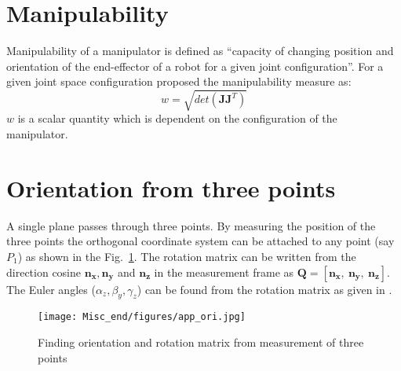 \section{Manipulability}
\label{app:manip}
Manipulability of a manipulator is defined as ``capacity of changing  position and orientation of the end-effector of a robot for a given  joint configuration''. For a given joint space configuration  \cite{yoshikawa1985manipulability} proposed the  manipulability measure as:
\begin{equation}
\label{eq:manip}
w = \sqrt{det(\mathbf{J}\mathbf{J}^T)}
\end{equation}
$w$ is a scalar quantity which is dependent on the configuration of the manipulator. 

\section{Orientation from three points}
\label{app:ori_1}
A single plane passes through three points. By measuring the position of the three points the orthogonal coordinate system can be attached to any point (say $P_1$) as shown in the Fig.~\ref{fig:app_ori}. The rotation matrix can be written from the direction cosine $\mathbf{n_x, n_y}$  and $\mathbf{n_z}$ in the measurement frame as $\mathbf{Q} = [\mathbf{n_x,~ n_y, ~ n_z}]$. The Euler angles ($\alpha_z, \beta_y, \gamma_z$) can be found from the rotation matrix as given in \cite{saha2014introduction}.
\begin{figure}[htbp]
\begin{center}
\texttt{[image: Misc\_end/figures/app\_ori.jpg]}
\caption{Finding orientation and rotation matrix from measurement of three points}
\label{fig:app_ori}
\end{center}
\end{figure}

